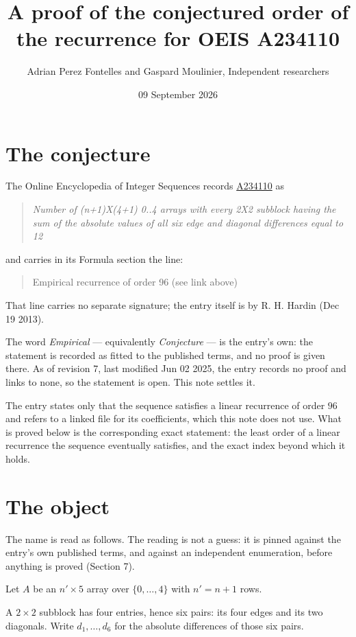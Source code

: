 \documentclass[11pt]{article}
\title{A proof of the conjectured order of the recurrence for OEIS A234110}
\author{Adrian Perez Fontelles and Gaspard Moulinier, Independent researchers}
\date{09 September 2026}
\theoremstyle{definition}
\begin{document}
\maketitle
\section{The conjecture}

The Online Encyclopedia of Integer Sequences records \href{https://oeis.org/A234110}{A234110} as

\begin{quote}\itshape Number of (n+1)X(4+1) 0..4 arrays with every 2X2 subblock having the sum of the absolute values of all six edge and diagonal differences equal to 12\end{quote}

and carries in its Formula section the line:

\begin{quote}\ttfamily Empirical recurrence of order 96 (see link above)\end{quote}

That line carries no separate signature; the entry itself is by R. H. Hardin (Dec 19 2013).

The word {\itshape Empirical} --- equivalently {\itshape Conjecture} --- is the entry's own: the statement is recorded as fitted to the published terms, and no proof is given there. As of revision 7, last modified Jun 02 2025, the entry records no proof and links to none, so the statement is open. This note settles it.

The entry states only that the sequence satisfies a linear recurrence of order $96$ and refers to a linked file for its coefficients, which this note does not use. What is proved below is the corresponding exact statement: the least order of a linear recurrence the sequence eventually satisfies, and the exact index beyond which it holds.

\section{The object}

The name is read as follows. The reading is not a guess: it is pinned against the entry's own published terms, and against an independent enumeration, before anything is proved (Section 7).

Let $A$ be an $n' \times 5$ array over $\{0,\dots,4\}$ with $n' = n + 1$ rows.

A $2\times2$ subblock has four entries, hence six pairs: its four edges and its two diagonals. Write $d_1,\dots,d_6$ for the absolute differences of those six pairs.
\end{document}
